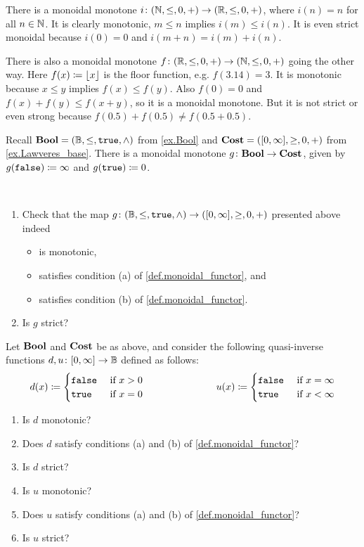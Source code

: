 \documentclass[7Sketches]{subfiles}
\begin{document}
\begin{example}
There is a monoidal monotone $i\colon(\mathbb{N},\leq,0,+)\to(\mathbb{R},\leq,0,+)$, where $i(n)=n$ for all $n\in\mathbb{N}$. It is clearly monotonic, $m\leq n$ implies $i(m)\leq i(n)$. It is even strict monoidal because $i(0)=0$ and $i(m+n)=i(m)+i(n)$.

There is also a monoidal monotone $f\colon(\mathbb{R},\leq,0,+)\to(\mathbb{N},\leq,0,+)$ going
the other way. Here $f(x)\coloneqq\lfloor x\rfloor$ is the floor function, e.g.
$f(3.14)=3$. It is monotonic because $x\leq y$ implies $f(x)\leq f(y)$. Also
$f(0)=0$ and $f(x)+f(y)\leq f(x+y)$, so it is a monoidal monotone. But it is not
strict or even strong because $f(0.5)+f(0.5)\neq f(0.5+0.5)$.
\end{example}

Recall $\mathbf{Bool}=(\mathbb{B},\leq,\mathtt{true},\wedge)$ from \cref{ex.Bool} and
$\mathbf{Cost}=([0,\infty],\ge,0,+)$ from \cref{ex.Lawveres_base}. There is a monoidal
monotone $g\colon\mathbf{Bool}\to\mathbf{Cost}$, given by $g(\mathtt{false})\coloneqq \infty$ and
$g(\mathtt{true})\coloneqq 0$.
\begin{exercise}%
\label{exc.bool_to_cost}~
\begin{enumerate}
	\item Check that the map $g\colon(\mathbb{B},\leq,\mathtt{true},\wedge)\to([0,\infty],\geq,0,+)$ presented above indeed
  \begin{itemize}
  	\item is monotonic,
  	\item satisfies condition (a) of \cref{def.monoidal_functor}, and
  	\item satisfies condition (b) of \cref{def.monoidal_functor}.
  \end{itemize}
  \item Is $g$ strict?
  \qedhere
\qedhere
\end{enumerate}
\end{exercise}


\begin{exercise}%
\label{exc.bool_to_cost_inverses}
Let $\mathbf{Bool}$ and $\mathbf{Cost}$ be as above, and consider the following quasi-inverse functions $d,u\colon[0,\infty]\to\mathbb{B}$ defined as follows:
\[
  d(x)\coloneqq
  \begin{cases}
  	\mathtt{false}&\textnormal{ if }x>0\\
		\mathtt{true}&\textnormal{ if } x=0
	\end{cases}
\hspace{1in}
  u(x)\coloneqq
  \begin{cases}
  	\mathtt{false}&\textnormal{ if }x=\infty\\
		\mathtt{true}&\textnormal{ if } x<\infty
	\end{cases}
\]
\begin{enumerate}
	\item Is $d$ monotonic?
	\item Does $d$ satisfy conditions (a) and (b) of \cref{def.monoidal_functor}?
	\item Is $d$ strict?
	\item Is $u$ monotonic?
	\item Does $u$ satisfy conditions (a) and (b) of \cref{def.monoidal_functor}?
	\item Is $u$ strict?
	\qedhere
\qedhere
\end{enumerate}
\end{exercise}
\end{document}
